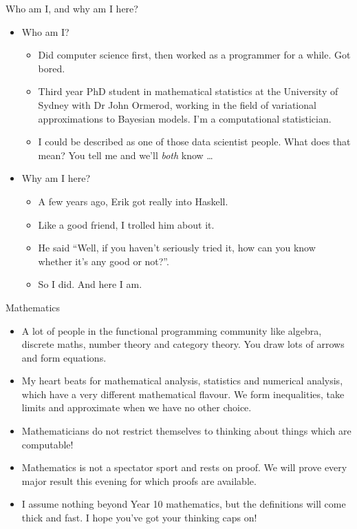 \documentclass{beamer}
\begin{document}
\begin{frame}{Who am I, and why am I here?}
\begin{itemize}
\item Who am I?
\begin{itemize}
\item Did computer science first, then worked as a programmer for a while. Got bored.\\
\item Third year PhD student in mathematical statistics at the University of Sydney with Dr John Ormerod, working 
in the field of variational approximations to Bayesian models. I'm a computational statistician.\\
\item I could be described as one of those data scientist people. What does that mean? You tell me and we'll
\emph{both} know \ldots
\end{itemize}

\item Why am I here?
\begin{itemize}
\item A few years ago, Erik got really into Haskell.\\
\item Like a good friend, I trolled him about it.\\
\item He said ``Well, if you haven't seriously tried it, how can you know whether it's
any good or not?''.\\
\item So I did. And here I am.
\end{itemize}
\end{itemize}
\end{frame}

\begin{frame}{Mathematics}
\begin{itemize}
\item A lot of people in the functional programming community like algebra, discrete maths, number theory and 
category theory. You draw lots of arrows and form equations.
\item My heart beats for mathematical analysis, statistics and numerical analysis, which have a very different mathematical flavour.
We form inequalities, take limits and approximate when we have no other choice.
\item Mathematicians do not restrict themselves to thinking about things which are computable! 
\item Mathematics is not a spectator sport and rests on proof. We will prove every major result this evening for which proofs are available.
\item I assume nothing beyond Year 10 mathematics, but the definitions will come
thick and fast. I hope you've got your thinking caps on!\\
\end{itemize}
\end{frame}
\end{document}

